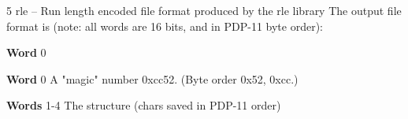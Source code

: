 


%
%
 5
rle -- Run length encoded file format produced by the rle library
The output file format is (note: all words are 16 bits, and in PDP-11 byte 
order):
\begin{TPlist}{{\bf Word} 0}
\item[{{\bf Word} 0}]
A "magic" number 0xcc52.  (Byte order 0x52, 0xcc.)
\item[{{\bf Words} 1-4}]
The structure (chars saved in PDP-11 order)


\end{TPlist}
